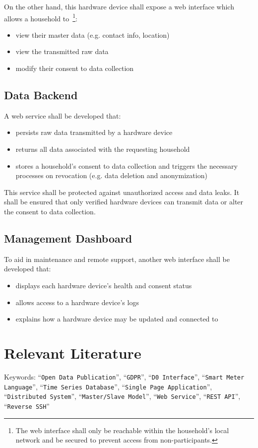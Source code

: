 \documentclass[11pt,a4paper]{article}
\begin{document}
On the other hand, this hardware device shall expose a web interface which allows a household to~\footnote{The web interface shall only be reachable within the household's local network and be secured to prevent access from non-participants.}:

\begin{itemize}
  \item view their master data (e.g. contact info, location)
  \item view the transmitted raw data
  \item modify their consent to data collection
\end{itemize}

\subsection{Data Backend}

A web service shall be developed that:

\begin{itemize}
  \item persists raw data transmitted by a hardware device
  \item returns all data associated with the requesting household
  \item stores a household's consent to data collection and triggers the necessary processes on revocation (e.g. data deletion and anonymization)
\end{itemize}

This service shall be protected against unauthorized access and data leaks. It shall be ensured that only verified hardware devices can transmit data or alter the consent to data collection. 

\subsection{Management Dashboard}

To aid in maintenance and remote support, another web interface shall be developed that:

\begin{itemize}
  \item displays each hardware device's health and consent status
  \item allows access to a hardware device's logs
  \item explains how a hardware device may be updated and connected to
\end{itemize}


\section{Relevant Literature}

Keywords: \enquote{\texttt{Open Data Publication}}, \enquote{\texttt{GDPR}}, \enquote{\texttt{D0 Interface}}, \enquote{\texttt{Smart Meter Language}}, \enquote{\texttt{Time Series Database}}, \enquote{\texttt{Single Page Application}}, \enquote{\texttt{Distributed System}}, \enquote{\texttt{Master/Slave Model}}, \enquote{\texttt{Web Service}}, \enquote{\texttt{REST API}}, \enquote{\texttt{Reverse SSH}}
\end{document}
